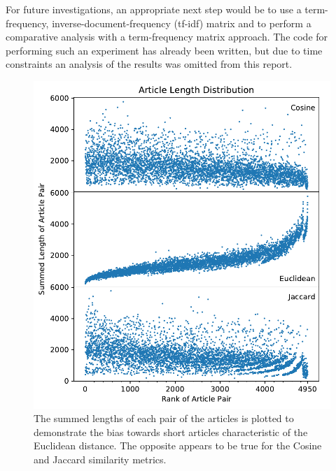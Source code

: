 \documentclass[11pt]{article}
\begin{document}
For future investigations, an appropriate next step would be to use a term-frequency, inverse-document-frequency (tf-idf) matrix and to perform a comparative analysis with a term-frequency matrix approach. 
The code for performing such an experiment has already been written, but due to time constraints an analysis of the results was omitted from this report.

\begin{figure}[h] \label{fig:articlelengths}
  \centering
  \includegraphics[width=\textwidth]{figures/article_length_dist}
  \caption{The summed lengths of each pair of the articles is plotted to demonstrate the bias towards short articles characteristic of the Euclidean distance. The opposite appears to be true for the Cosine and Jaccard similarity metrics.}
\end{figure}

{}

\end{document}

